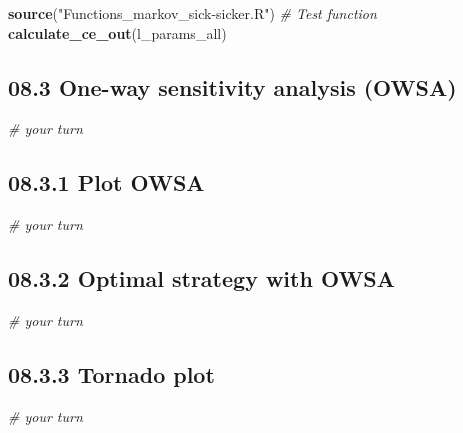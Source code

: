 \documentclass[
]{article}
\newenvironment{Shaded}{\begin{snugshade}}{\end{snugshade}}
\newcommand{\CommentTok}[1]{\textcolor[rgb]{0.56,0.35,0.01}{\textit{#1}}}
\newcommand{\KeywordTok}[1]{\textcolor[rgb]{0.13,0.29,0.53}{\textbf{#1}}}
\newcommand{\NormalTok}[1]{#1}
\newcommand{\StringTok}[1]{\textcolor[rgb]{0.31,0.60,0.02}{#1}}
\begin{document}
\begin{Shaded}
\begin{Highlighting}[]
\KeywordTok{source}\NormalTok{(}\StringTok{"Functions_markov_sick-sicker.R"}\NormalTok{)}
\CommentTok{# Test function}
\KeywordTok{calculate_ce_out}\NormalTok{(l_params_all)}
\end{Highlighting}
\end{Shaded}

\hypertarget{one-way-sensitivity-analysis-owsa}{%
\subsection{08.3 One-way sensitivity analysis
(OWSA)}\label{one-way-sensitivity-analysis-owsa}}

\begin{Shaded}
\begin{Highlighting}[]
\CommentTok{# your turn}
\end{Highlighting}
\end{Shaded}

\hypertarget{plot-owsa}{%
\subsection{08.3.1 Plot OWSA}\label{plot-owsa}}

\begin{Shaded}
\begin{Highlighting}[]
\CommentTok{# your turn}
\end{Highlighting}
\end{Shaded}

\hypertarget{optimal-strategy-with-owsa}{%
\subsection{08.3.2 Optimal strategy with
OWSA}\label{optimal-strategy-with-owsa}}

\begin{Shaded}
\begin{Highlighting}[]
\CommentTok{# your turn}
\end{Highlighting}
\end{Shaded}

\hypertarget{tornado-plot}{%
\subsection{08.3.3 Tornado plot}\label{tornado-plot}}

\begin{Shaded}
\begin{Highlighting}[]
\CommentTok{# your turn}
\end{Highlighting}
\end{Shaded}
\end{document}
